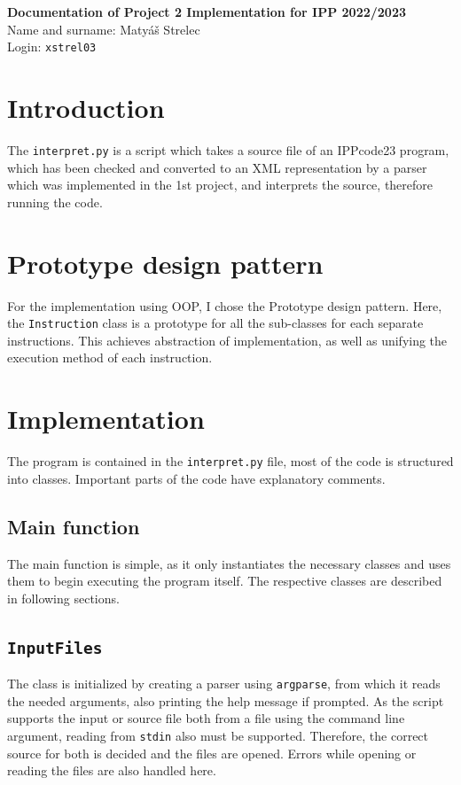 \documentclass[11pt,a4paper]{article}
\begin{document}
    \noindent
    \Large{\textbf{Documentation of Project 2 Implementation for IPP 2022/2023}}
    \normalsize \\
    Name and surname: Matyáš Strelec \\
    Login: \verb|xstrel03|


\section{Introduction}

The \verb|interpret.py| is a script which takes a source file of an IPPcode23 program, which has been checked and converted to an XML representation
by a parser which was implemented in the 1st project, and interprets the source, therefore running the code.


\section{Prototype design pattern}

For the implementation using OOP, I chose the Prototype design pattern\cite{prototype}. Here, the \verb|Instruction| class is 
a prototype for all the sub-classes for each separate instructions. This achieves abstraction of
implementation, as well as unifying the execution method of each instruction.


\section{Implementation}

The program is contained in the \verb|interpret.py| file, most of the code is structured into classes.
Important parts of the code have explanatory comments.


\subsection{Main function}

The main function is simple, as it only instantiates the necessary classes and uses them to begin 
executing the program itself. The respective classes are described in following sections.


\subsection{\texttt{InputFiles}}

The class is initialized by creating a parser using \verb|argparse|, from which it reads the needed
arguments, also printing the help message if prompted. As the script supports the input or source file both from a file using the command line argument, reading from \verb|stdin| also must be supported. Therefore, the 
correct source for both is decided and the files are opened. Errors while opening or reading the files are also handled here.
\end{document}
